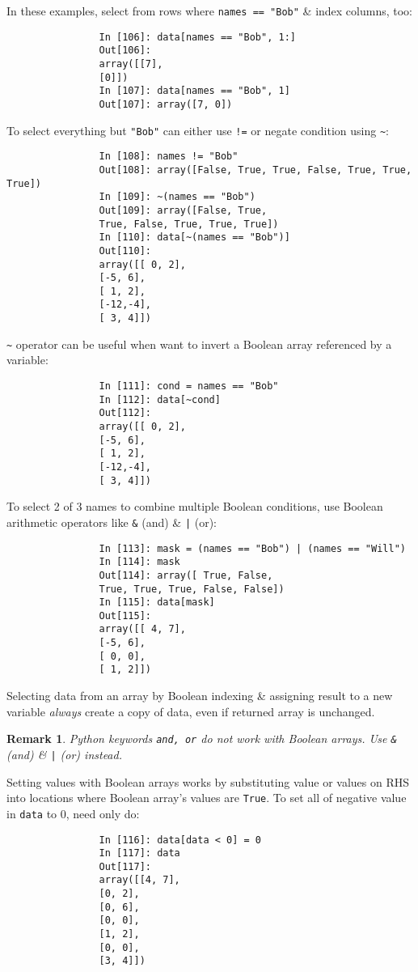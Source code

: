 \documentclass{article}
\newtheorem{remark}{Remark}
\begin{document}
\begin{itemize}
\begin{itemize}
\begin{itemize}
			In these examples, select from rows where {\tt names == "Bob"} \& index columns, too:
			\begin{verbatim}
				In [106]: data[names == "Bob", 1:]
				Out[106]:
				array([[7],
				[0]])
				In [107]: data[names == "Bob", 1]
				Out[107]: array([7, 0])
			\end{verbatim}
			To select everything but {\tt"Bob"} can either use {\tt!=} or negate condition using \verb|~|:
			\begin{verbatim}
				In [108]: names != "Bob"
				Out[108]: array([False, True, True, False, True, True, True])
				In [109]: ~(names == "Bob")
				Out[109]: array([False, True,
				True, False, True, True, True])
				In [110]: data[~(names == "Bob")]
				Out[110]:
				array([[ 0, 2],
				[-5, 6],
				[ 1, 2],
				[-12,-4],
				[ 3, 4]])
			\end{verbatim}
			\verb|~| operator can be useful when want to invert a Boolean array referenced by a variable:
			\begin{verbatim}
				In [111]: cond = names == "Bob"
				In [112]: data[~cond]
				Out[112]:
				array([[ 0, 2],
				[-5, 6],
				[ 1, 2],
				[-12,-4],
				[ 3, 4]])
			\end{verbatim}
			To select 2 of 3 names to combine multiple Boolean conditions, use Boolean arithmetic operators like {\tt\&} (and) \& {\tt|} (or):
			\begin{verbatim}
				In [113]: mask = (names == "Bob") | (names == "Will")
				In [114]: mask
				Out[114]: array([ True, False,
				True, True, True, False, False])
				In [115]: data[mask]
				Out[115]:
				array([[ 4, 7],
				[-5, 6],
				[ 0, 0],
				[ 1, 2]])
			\end{verbatim}
			Selecting data from an array by Boolean indexing \& assigning result to a new variable {\it always} create a copy of data, even if returned array is unchanged.
			\begin{remark}
				Python keywords {\tt and, or} do not work with Boolean arrays. Use {\tt\&} (and) \& {\tt|} (or) instead.
			\end{remark}
			Setting values with Boolean arrays works by substituting value or values on RHS into locations where Boolean array's  values are {\tt True}. To set all of negative value in {\tt data} to 0, need only do:
			\begin{verbatim}
				In [116]: data[data < 0] = 0
				In [117]: data
				Out[117]:
				array([[4, 7],
				[0, 2],
				[0, 6],
				[0, 0],
				[1, 2],
				[0, 0],
				[3, 4]])
			\end{verbatim}

\end{itemize}
\end{itemize}
\end{itemize}
\end{document}
